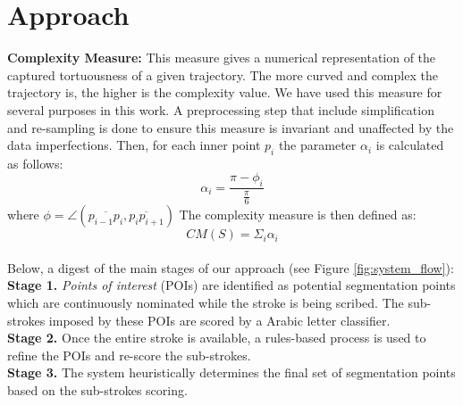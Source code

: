 \documentclass[journal,compsoc]{IEEEtran}
\begin{document}
\section{Approach}
\label{sec:approach}

\textbf{Complexity Measure:} This measure gives a numerical representation of the captured tortuousness of a given trajectory. The more curved and complex the trajectory is, the higher is the complexity value. We have used this measure for several purposes in this work.
A preprocessing step that include simplification and re-sampling is done to ensure this measure is invariant and unaffected by the data imperfections. Then, for each inner point $p_i$ the parameter $\alpha_{i}$ is calculated as follows:
\begin{equation}
 \alpha_{i}=\frac{\pi-\phi_{i}}{\frac{\pi}{6}}
\end{equation}
where $\phi=\angle(\overline{p_{i-1}p_{i}},\overline{p_{i}p_{i+1}})$ 
The complexity measure is then defined as:
\begin{equation}
CM(S)=\Sigma_{i}\alpha_{i}
\end{equation}\\

Below, a digest of the main stages of our approach (see Figure \ref{fig:system_flow}):\\
\textbf{Stage 1.}  \emph{Points of interest} (POIs) are identified as potential segmentation points which are continuously nominated while the stroke is being scribed. The sub-strokes imposed by these POIs are scored by a Arabic letter classifier.\\
\textbf{Stage 2.} Once the entire stroke is available, a rules-based process is used to refine the POIs and re-score the sub-strokes.\\
\textbf{Stage 3.} The system heuristically determines the final set of segmentation points based on the sub-strokes scoring.\\
\end{document}
